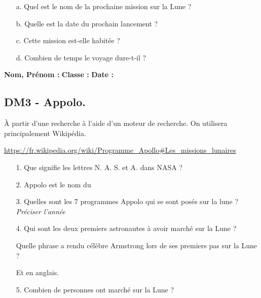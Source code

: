 \begin{enumerate}
  \item[a.] Quel est le nom de la prochaine mission sur la Lune ? \dotfill
  \item[b.] Quelle est la date du prochain lancement ? \dotfill
  \item[c.] Cette mission est-elle habitée ? \dotfill
  \item[d.] Combien de temps le voyage dure-t-il ? \dotfill
\end{enumerate}

\newpage

\textbf{Nom, Prénom :} \hspace{8cm} \textbf{Classe :} \hspace{3cm} \textbf{Date :}\\

\subsection*{DM3 - Appolo.}

À partir d'une recherche à l'aide d'un moteur de recherche. On utilisera principalement Wikipédia.

\url{https://fr.wikipedia.org/wiki/Programme_Apollo#Les_missions_lunaires}


\begin{enumerate}
  \item[1.]Que signifie les lettres N. A. S. et A. dans NASA ? \\
  \Pointilles[2]

  \item[2.]Appolo est le nom du \dotfill
  
  \item[3.]Quelles sont les 7 programmes Appolo qui se sont posés sur la lune ? \textit{Préciser l'année} \\
  \Pointilles[4]

  \item[4.]Qui sont les deux premiers astronautes à avoir marché sur la Lune ? \\
  \Pointilles[1]

  Quelle phrase a rendu célèbre Armstrong lors de ses premiers pas sur la Lune ? \\
  \Pointilles[2]

  Et en anglais. \\
  \Pointilles[2]

  \item[5.]Combien de personnes ont marché sur la Lune ? \\
  \Pointilles[3]
\end{enumerate}

